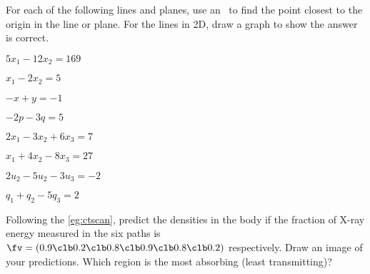 
\begin{exercise} \label{ex:} 
For each of the following lines and planes,
use an \svd\ to find the point closest to the origin in the line or plane.
For the lines in 2D, draw a graph to show the answer is correct.
\begin{parts}
\item \(5x_1-12x_2=169\)

\item \(x_1-2x_2=5\)

\item \(-x+y=-1\)

\item \(-2p-3q=5\)

\item \(2x_1-3x_2+6x_3=7\)

\item \(x_1+4x_2-8x_3=27\)

\item \(2u_2-5u_2-3u_3=-2\)

\item \(q_1+q_2-5q_3=2\)

\end{parts}
\end{exercise}



\begin{exercise} \label{ex:} 
Following the  \autoref{eg:ctscan}, predict the densities in the body if the fraction of X-ray energy measured in the six paths is \(\fv=(0.9\clb 0.2\clb 0.8\clb 0.9\clb 0.8\clb 0.2)\) respectively.  
Draw an image of your predictions.  Which region is the most absorbing (least transmitting)?
\end{exercise}



